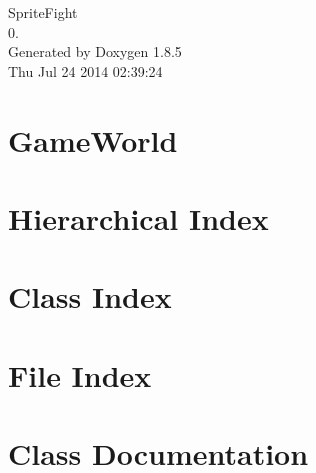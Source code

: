 \documentclass[twoside]{book}
\newcommand{\clearemptydoublepage}{%
  \newpage{\pagestyle{empty}\cleardoublepage}%
}
\begin{document}
\hypersetup{pageanchor=false}
\begin{titlepage}
\vspace*{7cm}
\begin{center}%
{\Large Sprite\-Fight \\[1ex]\large 0. }\\
\vspace*{1cm}
{\large Generated by Doxygen 1.8.5}\\
\vspace*{0.5cm}
{\small Thu Jul 24 2014 02:39:24}\\
\end{center}
\end{titlepage}
\clearemptydoublepage
\tableofcontents
\clearemptydoublepage
{}
\hypersetup{pageanchor=true}

\chapter{Game\-World}
\label{md___volumes__o_s__x__h_d_d__users__adam__developer__sprite_fight__r_e_a_d_m_e}
\hypertarget{md___volumes__o_s__x__h_d_d__users__adam__developer__sprite_fight__r_e_a_d_m_e}{}

\chapter{Hierarchical Index}

\chapter{Class Index}

\chapter{File Index}

\chapter{Class Documentation}















































\end{document}
